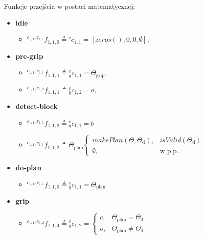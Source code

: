Funkcje przejścia w postaci matematycznej:
\begin{itemize}
    \item \textbf{idle} \begin{itemize}
        \item ${}^{c_{1,1}, c_{1,1}}f_{1,1,0} \triangleq {}^{c}c_{1,1} = [zeros(), 0, 0, \emptyset]$,
    \end{itemize} 

    \item \textbf{pre-grip} \begin{itemize}
        \item ${}^{c_{1,1}, e_{1,1}}f_{1,1,1} \triangleq {}^{e}_{y}c_{1,1} = \Theta_{\mathrm{grip}}$,
        \item ${}^{c_{1,1}, e_{1,2}}f_{1,1,1} \triangleq {}^{e}_{y}c_{1,2} = o$,
    \end{itemize}

    \item \textbf{detect-block} \begin{itemize}
        \item ${}^{c_{1,1}, r_{1,1}}f_{1,1,2} \triangleq {}^{r}_{y}c_{1,1} = b$
        \item ${}^{c_{1,1}, c_{1,1}}f_{1,1,2} \triangleq \Theta_{\mathrm{plan}}
            \begin{cases}
			    makePlan(\Theta, \Theta_{\mathrm{d}}), & isValid(\Theta_{\mathrm{d}})\\
                \emptyset, & \text{w p.p.}
		    \end{cases}$
    \end{itemize}
    
    \item \textbf{do-plan} \begin{itemize}
        \item ${}^{c_{1,1}, e_{1,1}}f_{1,1,3} \triangleq {}^{e}_{y}c_{1,1} = \Theta_{\mathrm{plan}}$
    \end{itemize}

    \item \textbf{grip} \begin{itemize}
        \item ${}^{c_{1,1}, e_{1,2}}f_{1,1,4} \triangleq {}^{e}_{y}c_{1,2} = \begin{cases}
            c, & \Theta_{\mathrm{plan}} = \Theta_{\mathrm{d}}\\
            o, & \Theta_{\mathrm{plan}} \neq \Theta_{\mathrm{d}}
        \end{cases}$
    \end{itemize}


\end{itemize}
